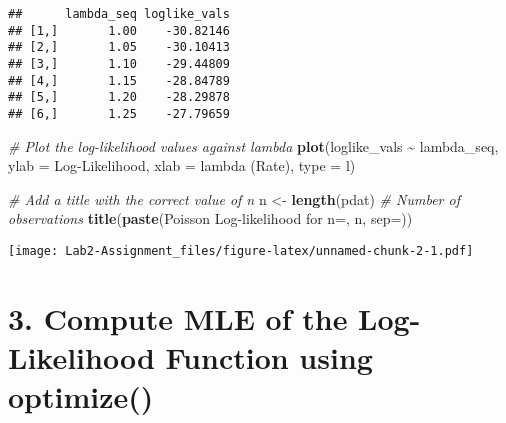 \documentclass[
]{article}
\newenvironment{Shaded}{\begin{snugshade}}{\end{snugshade}}
\newcommand{\AttributeTok}[1]{\textcolor[rgb]{0.13,0.29,0.53}{#1}}
\newcommand{\CommentTok}[1]{\textcolor[rgb]{0.56,0.35,0.01}{\textit{#1}}}
\newcommand{\ConstantTok}[1]{\textcolor[rgb]{0.56,0.35,0.01}{#1}}
\newcommand{\DecValTok}[1]{\textcolor[rgb]{0.00,0.00,0.81}{#1}}
\newcommand{\FloatTok}[1]{\textcolor[rgb]{0.00,0.00,0.81}{#1}}
\newcommand{\FunctionTok}[1]{\textcolor[rgb]{0.13,0.29,0.53}{\textbf{#1}}}
\newcommand{\NormalTok}[1]{#1}
\newcommand{\OtherTok}[1]{\textcolor[rgb]{0.56,0.35,0.01}{#1}}
\newcommand{\SpecialCharTok}[1]{\textcolor[rgb]{0.81,0.36,0.00}{\textbf{#1}}}
\newcommand{\StringTok}[1]{\textcolor[rgb]{0.31,0.60,0.02}{#1}}
\begin{document}
\begin{verbatim}
##      lambda_seq loglike_vals
## [1,]       1.00    -30.82146
## [2,]       1.05    -30.10413
## [3,]       1.10    -29.44809
## [4,]       1.15    -28.84789
## [5,]       1.20    -28.29878
## [6,]       1.25    -27.79659
\end{verbatim}

\begin{Shaded}
\begin{Highlighting}[]
\CommentTok{\# Plot the log{-}likelihood values against lambda}
\FunctionTok{plot}\NormalTok{(loglike\_vals }\SpecialCharTok{\textasciitilde{}}\NormalTok{ lambda\_seq, }\AttributeTok{ylab =} \StringTok{\textquotesingle{}Log{-}Likelihood\textquotesingle{}}\NormalTok{, }\AttributeTok{xlab =} \StringTok{\textquotesingle{}lambda (Rate)\textquotesingle{}}\NormalTok{, }\AttributeTok{type =} \StringTok{\textquotesingle{}l\textquotesingle{}}\NormalTok{)}

\CommentTok{\# Add a title with the correct value of n}
\NormalTok{n }\OtherTok{\textless{}{-}} \FunctionTok{length}\NormalTok{(pdat)  }\CommentTok{\# Number of observations}
\FunctionTok{title}\NormalTok{(}\FunctionTok{paste}\NormalTok{(}\StringTok{\textquotesingle{}Poisson Log{-}likelihood for n=\textquotesingle{}}\NormalTok{, n, }\AttributeTok{sep=}\StringTok{\textquotesingle{}\textquotesingle{}}\NormalTok{))}
\end{Highlighting}
\end{Shaded}

\texttt{[image: Lab2-Assignment\_files/figure-latex/unnamed-chunk-2-1.pdf]}

\hypertarget{compute-mle-of-the-log-likelihood-function-using-optimize}{%
\section{3. Compute MLE of the Log-Likelihood Function using
optimize()}\label{compute-mle-of-the-log-likelihood-function-using-optimize}}

\begin{Shaded}
\end{Shaded}
\end{document}
